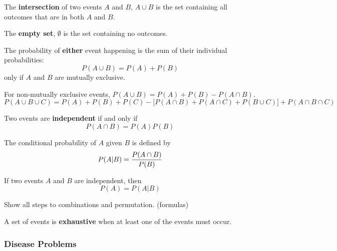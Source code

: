 \documentclass[english, 12pt]{article}
\begin{document}
\begin{defn}
The \textbf{intersection} of two events $A$ and $B$, $ A \cup B$ is the set containing all outcomes that are in both $A$ and $B$.
\end{defn}

\begin{defn}
The \textbf{empty set}, $\emptyset$ is the set containing no outcomes.
\end{defn}

\begin{defn}
The probability of \textbf{either} event happening is the sum of their individual probabilities:
\[ P(A \cup B) = P(A) + P(B)\]
only if $A$ and $B$ are mutually exclusive.
\end{defn}

\begin{note}
For non-mutually exclusive events, $P(A \cup B) = P(A) + P(B) - P(A \cap B)$.
\[P(A \cup B \cup C) = P(A) + P(B) + P(C) - \lbrack P (A \cap B) + P(A \cap C) + P (B \cup C)\rbrack + P (A \cap B \cap C)\]
\end{note}

\begin{defn}
Two events are \textbf{independent} if and only if
\[ P(A \cap B) = P(A) P(B)\]
\end{defn}

\begin{defn}
The conditional probability of $A$ given $B$ is defined by
\[ P(A | B) = \frac{P(A \cap B)}{P(B)}\]
\end{defn}

\begin{note}
If two events $A$ and $B$ are independent, then
\[P(A) = P(A | B)\]
\end{note}

\begin{qte}
Show all steps to combinations and permutation. (formulas)
\end{qte}

\begin{defn}
A set of events is \textbf{exhaustive} when at least one of the events must occur.
\end{defn}

\subsubsection*{Disease Problems}
\end{document}
